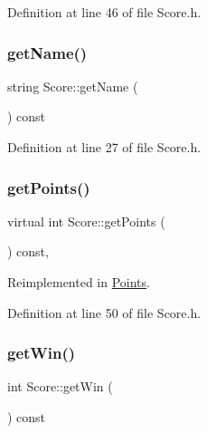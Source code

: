 Definition at line 46 of file Score.\+h.

\hypertarget{class_score_a0d02204131d650c52439fea0ea638720}{}\label{class_score_a0d02204131d650c52439fea0ea638720} 
\subsubsection{\texorpdfstring{get\+Name()}{getName()}}
{\footnotesize\ttfamily string Score\+::get\+Name (\begin{DoxyParamCaption}{ }\end{DoxyParamCaption}) const\hspace{0.3cm}{\ttfamily [inline]}}



Definition at line 27 of file Score.\+h.

\hypertarget{class_score_a62f662eefb7584c4b039de697cd696e2}{}\label{class_score_a62f662eefb7584c4b039de697cd696e2} 
\subsubsection{\texorpdfstring{get\+Points()}{getPoints()}}
{\footnotesize\ttfamily virtual int Score\+::get\+Points (\begin{DoxyParamCaption}{ }\end{DoxyParamCaption}) const\hspace{0.3cm}{\ttfamily [inline]}, {\ttfamily [virtual]}}



Reimplemented in \hyperlink{class_points_a0bcaad8a1ad4a694fb83200eec97c9ce}{Points}.



Definition at line 50 of file Score.\+h.

\hypertarget{class_score_a73db6344bb2a93f4ab29b9b2a5c13bd1}{}\label{class_score_a73db6344bb2a93f4ab29b9b2a5c13bd1} 
\subsubsection{\texorpdfstring{get\+Win()}{getWin()}}
{\footnotesize\ttfamily int Score\+::get\+Win (\begin{DoxyParamCaption}{ }\end{DoxyParamCaption}) const\hspace{0.3cm}{\ttfamily [inline]}}



